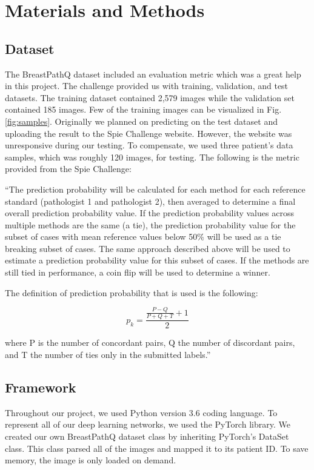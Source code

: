 \documentclass[11pt]{ieeeconf}
\begin{document}
\section{Materials and Methods}
\subsection{Dataset}
The BreastPathQ dataset included an evaluation metric which was a great help in this project. The challenge provided us with training, validation, and test datasets. The training dataset contained 2,579 images while the validation set contained 185 images. Few of the training images can be visualized in Fig. \ref{fig:samples}. Originally we planned on predicting on the test dataset and uploading the result to the Spie Challenge website. However, the website was unresponsive during our testing. To compensate, we used three patient’s data samples, which was roughly 120 images, for testing. The following is the metric provided from the Spie Challenge:

\begin{displayquote}
``The prediction probability will be calculated for each method for each reference standard (pathologist 1 and pathologist 2), then averaged to determine a final overall prediction probability value. If the prediction probability values across multiple methods are the same (a tie), the prediction probability value for the subset of cases with mean reference values below 50\% will be used as a tie breaking subset of cases. The same approach described above will be used to estimate a prediction probability value for this subset of cases. If the methods are still tied in performance, a coin flip will be used to determine a winner.

The definition of prediction probability that is used is the following:

$$p_k=\frac{\frac{P - Q}{P + Q + T} + 1}{2}$$

where P is the number of concordant pairs, Q the number of discordant pairs, and T the number of ties only in the submitted labels.''\cite{spie}
\end{displayquote}

\subsection{Framework}
Throughout our project, we used Python version 3.6 coding language. To represent all of our deep learning networks, we used the PyTorch library. We created our own BreastPathQ dataset class by inheriting PyTorch’s DataSet class. This class parsed all of the images and mapped it to its patient ID. To save memory, the image is only loaded on demand.
\end{document}

